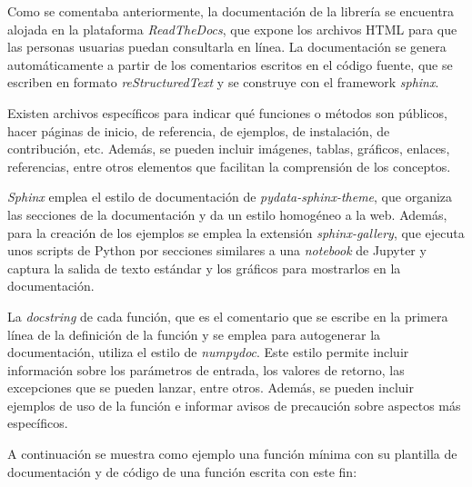 Como se comentaba anteriormente, la documentación de la librería \pvlibpy{} se encuentra alojada en la plataforma \textit{ReadTheDocs}, que expone los archivos HTML para que las personas usuarias puedan consultarla en línea. La documentación se genera automáticamente a partir de los comentarios escritos en el código fuente, que se escriben en formato \textit{\gls{reStructuredText}} y se construye con el \gls{framework} \textit{sphinx}.

Existen archivos específicos para indicar qué funciones o métodos son públicos, hacer páginas de inicio, de referencia, de ejemplos, de instalación, de contribución, etc. Además, se pueden incluir imágenes, tablas, gráficos, enlaces, referencias, entre otros elementos que facilitan la comprensión de los conceptos.

\textit{Sphinx} emplea el estilo de documentación de \textit{pydata-sphinx-theme}, que organiza las secciones de la documentación y da un estilo homogéneo a la web. Además, para la creación de los ejemplos se emplea la extensión \textit{sphinx-gallery}, que ejecuta unos scripts de Python por secciones similares a una \textit{notebook} de Jupyter y captura la salida de texto \gls{estándar} y los gráficos para mostrarlos en la documentación.

La \textit{\gls{docstring}} de cada \gls{función}, que es el comentario que se escribe en la primera línea de la definición de la función y se emplea para autogenerar la documentación, utiliza el estilo de \textit{numpydoc}. Este estilo permite incluir información sobre los parámetros de entrada, los \gls{valores de retorno}, las excepciones que se pueden lanzar, entre otros. Además, se pueden incluir ejemplos de uso de la función e informar avisos de precaución sobre aspectos más específicos.

A continuación se muestra como ejemplo una función mínima con su plantilla de documentación y de código de una función escrita con este fin:

